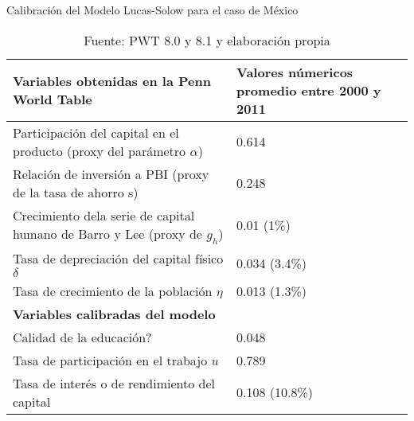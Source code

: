 \documentclass[12pt,notitlepage]{report}
\begin{document}
     	\begin{table}[H]
     		\caption{Calibración del Modelo Lucas-Solow para el caso de México}\label{t1}
     		\vspace{0.7cm}
     		\begin{tabular}{|l|l|}
     			\hline
     			\parbox{8cm}{\textbf{Variables obtenidas en la Penn World Table}} & \parbox{8cm}{\textbf{Valores númericos promedio entre 2000 y 2011}} \\ 
     			\hline
     			\parbox{8cm}{Participación del capital en el producto (proxy del parámetro $\alpha$)}&0.614\\
     			\hline
     			\parbox{8cm}{Relación de inversión a PBI (proxy de la tasa de ahorro s)}& 0.248\\
     			\hline
     			\parbox{8cm}{Crecimiento dela serie de capital humano de Barro y Lee (proxy de $g_h$)}&0.01 (1\%)\\
     			\hline
     			Tasa de depreciación del capital físico $\delta$ &0.034 (3.4\%)\\
     			\hline
     			Tasa de crecimiento de la población $\eta$ &0.013 (1.3\%)\\
     			\hline
     			\textbf{Variables calibradas del modelo}&\\
     			\hline
     			Calidad de la educación?& 0.048\\
     			\hline
     			Tasa de participación en el trabajo $u$&0.789\\
     			\hline
     			Tasa de interés o de rendimiento del capital&0.108 (10.8\%)\\
     			\hline
     		\end{tabular}
     		\vspace{0.3cm}
     		\captionsetup{singlelinecheck=off}
     		\caption*{Fuente: PWT 8.0 y 8.1 y elaboración propia}
     	\end{table}
     	\nocite{*}
     	
     	
\end{document}
